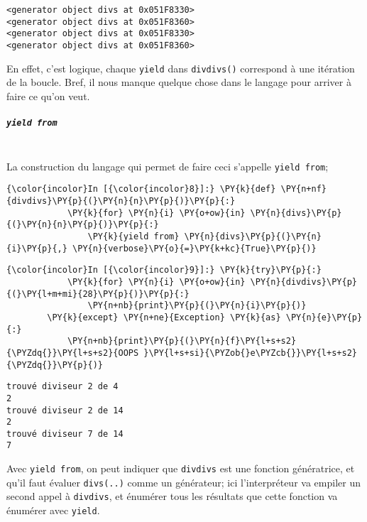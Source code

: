     \begin{Verbatim}[commandchars=\\\{\}]
<generator object divs at 0x051F8330>
<generator object divs at 0x051F8360>
<generator object divs at 0x051F8330>
<generator object divs at 0x051F8360>

    \end{Verbatim}

    En effet, c'est logique, chaque \texttt{yield} dans \texttt{divdivs()}
correspond à une itération de la boucle. Bref, il nous manque quelque
chose dans le langage pour arriver à faire ce qu'on veut.

    \hypertarget{yield-from}{%
\subparagraph{\texorpdfstring{\texttt{yield\ from}}{yield from}\\\\}\label{yield-from}}

    La construction du langage qui permet de faire ceci s'appelle
\texttt{yield\ from};

    \begin{Verbatim}[commandchars=\\\{\}]
{\color{incolor}In [{\color{incolor}8}]:} \PY{k}{def} \PY{n+nf}{divdivs}\PY{p}{(}\PY{n}{n}\PY{p}{)}\PY{p}{:}
            \PY{k}{for} \PY{n}{i} \PY{o+ow}{in} \PY{n}{divs}\PY{p}{(}\PY{n}{n}\PY{p}{)}\PY{p}{:}
                \PY{k}{yield from} \PY{n}{divs}\PY{p}{(}\PY{n}{i}\PY{p}{,} \PY{n}{verbose}\PY{o}{=}\PY{k+kc}{True}\PY{p}{)}
\end{Verbatim}


    \begin{Verbatim}[commandchars=\\\{\}]
{\color{incolor}In [{\color{incolor}9}]:} \PY{k}{try}\PY{p}{:}
            \PY{k}{for} \PY{n}{i} \PY{o+ow}{in} \PY{n}{divdivs}\PY{p}{(}\PY{l+m+mi}{28}\PY{p}{)}\PY{p}{:}
                \PY{n+nb}{print}\PY{p}{(}\PY{n}{i}\PY{p}{)}
        \PY{k}{except} \PY{n+ne}{Exception} \PY{k}{as} \PY{n}{e}\PY{p}{:}
            \PY{n+nb}{print}\PY{p}{(}\PY{n}{f}\PY{l+s+s2}{\PYZdq{}}\PY{l+s+s2}{OOPS }\PY{l+s+si}{\PYZob{}e\PYZcb{}}\PY{l+s+s2}{\PYZdq{}}\PY{p}{)}
\end{Verbatim}


    \begin{Verbatim}[commandchars=\\\{\}]
trouvé diviseur 2 de 4
2
trouvé diviseur 2 de 14
2
trouvé diviseur 7 de 14
7

    \end{Verbatim}

    Avec \texttt{yield\ from}, on peut indiquer que \texttt{divdivs} est une
fonction génératrice, et qu'il faut évaluer \texttt{divs(..)} comme un
générateur; ici l'interpréteur va empiler un second appel à
\texttt{divdivs}, et énumérer tous les résultats que cette fonction va
énumérer avec \texttt{yield}.